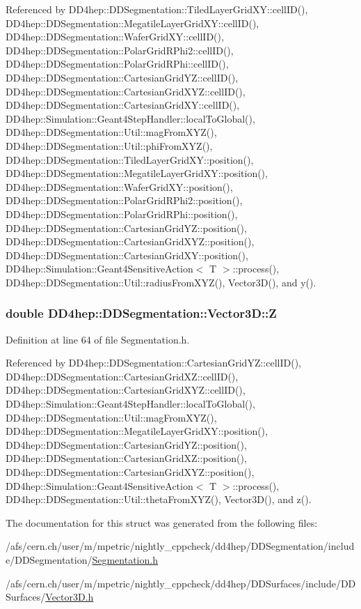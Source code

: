 Referenced by DD4hep::DDSegmentation::TiledLayerGridXY::cellID(), DD4hep::DDSegmentation::MegatileLayerGridXY::cellID(), DD4hep::DDSegmentation::WaferGridXY::cellID(), DD4hep::DDSegmentation::PolarGridRPhi2::cellID(), DD4hep::DDSegmentation::PolarGridRPhi::cellID(), DD4hep::DDSegmentation::CartesianGridYZ::cellID(), DD4hep::DDSegmentation::CartesianGridXYZ::cellID(), DD4hep::DDSegmentation::CartesianGridXY::cellID(), DD4hep::Simulation::Geant4StepHandler::localToGlobal(), DD4hep::DDSegmentation::Util::magFromXYZ(), DD4hep::DDSegmentation::Util::phiFromXYZ(), DD4hep::DDSegmentation::TiledLayerGridXY::position(), DD4hep::DDSegmentation::MegatileLayerGridXY::position(), DD4hep::DDSegmentation::WaferGridXY::position(), DD4hep::DDSegmentation::PolarGridRPhi2::position(), DD4hep::DDSegmentation::PolarGridRPhi::position(), DD4hep::DDSegmentation::CartesianGridYZ::position(), DD4hep::DDSegmentation::CartesianGridXYZ::position(), DD4hep::DDSegmentation::CartesianGridXY::position(), DD4hep::Simulation::Geant4SensitiveAction$<$ T $>$::process(), DD4hep::DDSegmentation::Util::radiusFromXYZ(), Vector3D(), and y().\hypertarget{struct_d_d4hep_1_1_d_d_segmentation_1_1_vector3_d_a80100f70c9d120e5a5f6abd1fcbac26f}{
\subsubsection[{Z}]{\setlength{\rightskip}{0pt plus 5cm}double {\bf DD4hep::DDSegmentation::Vector3D::Z}}}
\label{struct_d_d4hep_1_1_d_d_segmentation_1_1_vector3_d_a80100f70c9d120e5a5f6abd1fcbac26f}


Definition at line 64 of file Segmentation.h.

Referenced by DD4hep::DDSegmentation::CartesianGridYZ::cellID(), DD4hep::DDSegmentation::CartesianGridXZ::cellID(), DD4hep::DDSegmentation::CartesianGridXYZ::cellID(), DD4hep::Simulation::Geant4StepHandler::localToGlobal(), DD4hep::DDSegmentation::Util::magFromXYZ(), DD4hep::DDSegmentation::MegatileLayerGridXY::position(), DD4hep::DDSegmentation::CartesianGridYZ::position(), DD4hep::DDSegmentation::CartesianGridXZ::position(), DD4hep::DDSegmentation::CartesianGridXYZ::position(), DD4hep::Simulation::Geant4SensitiveAction$<$ T $>$::process(), DD4hep::DDSegmentation::Util::thetaFromXYZ(), Vector3D(), and z().

The documentation for this struct was generated from the following files:\begin{DoxyCompactItemize}
\item 
/afs/cern.ch/user/m/mpetric/nightly\_\-cppcheck/dd4hep/DDSegmentation/include/DDSegmentation/\hyperlink{_segmentation_8h}{Segmentation.h}\item 
/afs/cern.ch/user/m/mpetric/nightly\_\-cppcheck/dd4hep/DDSurfaces/include/DDSurfaces/\hyperlink{_vector3_d_8h}{Vector3D.h}\end{DoxyCompactItemize}
